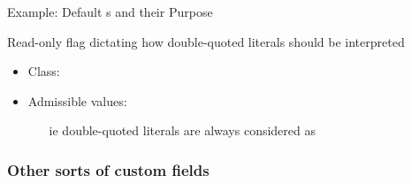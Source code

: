 \documentclass[handout]{beamer}
\begin{document}
\begin{frame}[allowframebreaks]{Example: Default s and their Purpose}
    \begin{block}{}
        Read-only flag dictating how double-quoted literals should be interpreted
        \begin{itemize}
            \item Class: 
            \item Admissible values: 
            \begin{itemize}
                \item[ie] double-quoted literals are always considered as 
            \end{itemize}
        \end{itemize}
    \end{block}
\end{frame}

\subsubsection{Other sorts of custom fields}
\end{document}
